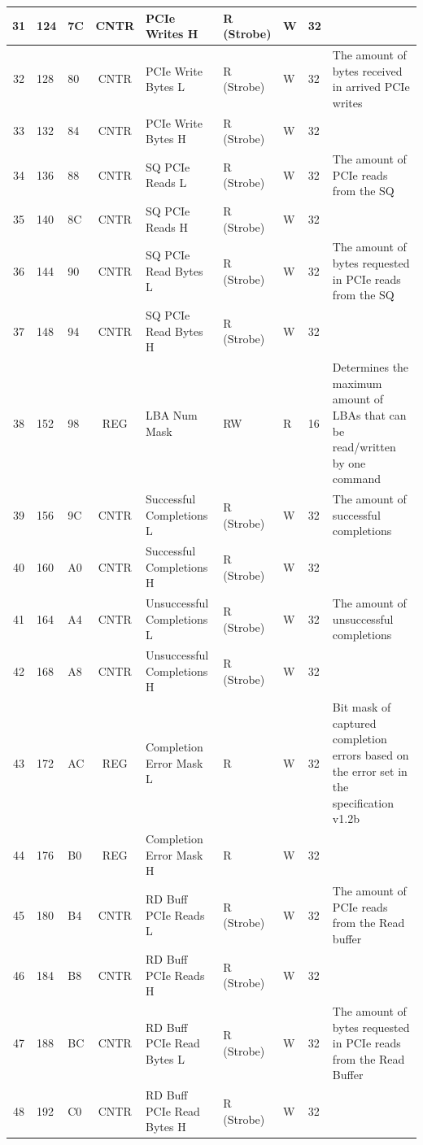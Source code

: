 \begin{landscape}
\begin{longtable}{|c|p{1.1cm}|p{1.1cm}|c|p{5.1cm}|p{1.4cm}|p{1.3cm}|p{1.3cm}|p{6cm}|}
31 & 124 & 7C & CNTR & PCIe Writes H & R (Strobe) & W & 32 &  \\ \hline
32 & 128 & 80 & CNTR & PCIe Write Bytes L & R (Strobe) & W & 32 & The amount of bytes received in arrived PCIe writes \\ \hline
33 & 132 & 84 & CNTR & PCIe Write Bytes H & R (Strobe) & W & 32 &  \\ \hline
34 & 136 & 88 & CNTR & SQ PCIe Reads L & R (Strobe) & W & 32 & The amount of PCIe reads from the SQ \\ \hline
35 & 140 & 8C & CNTR & SQ PCIe Reads H & R (Strobe) & W & 32 &  \\ \hline
36 & 144 & 90 & CNTR & SQ PCIe Read Bytes L & R (Strobe) & W & 32 & The amount of bytes requested in PCIe reads from the SQ \\ \hline
37 & 148 & 94 & CNTR & SQ PCIe Read Bytes H & R (Strobe) & W & 32 &  \\ \hline
38 & 152 & 98 & REG & LBA Num Mask & RW & R & 16 & Determines the maximum amount of LBAs that can be read/written by one command \\ \hline
39 & 156 & 9C & CNTR & Successful Completions L & R (Strobe) & W & 32 & The amount of successful completions \\ \hline
40 & 160 & A0 & CNTR & Successful Completions H & R (Strobe) & W & 32 &  \\ \hline
41 & 164 & A4 & CNTR & Unsuccessful Completions L & R (Strobe) & W & 32 & The amount of unsuccessful completions \\ \hline
42 & 168 & A8 & CNTR & Unsuccessful Completions H & R (Strobe) & W & 32 &  \\ \hline
43 & 172 & AC & REG & Completion Error Mask L & R & W & 32 & Bit mask of captured completion errors based on the error set in the specification v1.2b \\ \hline
44 & 176 & B0 & REG & Completion Error Mask H & R & W & 32 &  \\ \hline
45 & 180 & B4 & CNTR & RD Buff PCIe Reads L & R (Strobe) & W & 32 & The amount of PCIe reads from the Read buffer \\ \hline
46 & 184 & B8 & CNTR & RD Buff PCIe Reads H & R (Strobe) & W & 32 &  \\ \hline
47 & 188 & BC & CNTR & RD Buff PCIe Read Bytes L & R (Strobe) & W & 32 & The amount of bytes requested in PCIe reads from the Read Buffer \\ \hline
48 & 192 & C0 & CNTR & RD Buff PCIe Read Bytes H & R (Strobe) & W & 32 &  \\ \hline

\end{longtable}
\end{landscape}

